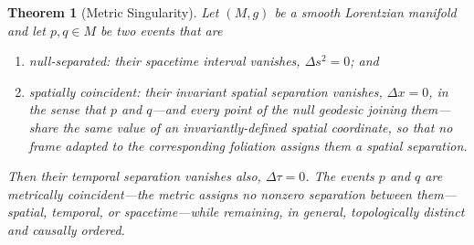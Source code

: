 \documentclass[11pt,a4paper]{article}
\theoremstyle{plain}
\newtheorem{theorem}{Theorem}
\theoremstyle{remark}
\begin{document}
\begin{theorem}[Metric Singularity]\label{thm:metric-singularity}
Let $(M,g)$ be a smooth Lorentzian manifold and let $p,q\in M$ be two events that are
\begin{enumerate}
\item[(a)] \emph{null-separated}: their spacetime interval vanishes, $\Delta s^2=0$; and
\item[(b)] \emph{spatially coincident}: their invariant spatial separation vanishes, $\Delta x=0$, in the sense that $p$ and $q$---and every point of the null geodesic joining them---share the same value of an invariantly-defined spatial coordinate, so that no frame adapted to the corresponding foliation assigns them a spatial separation.
\end{enumerate}
Then their temporal separation vanishes also, $\Delta\tau=0$. The events $p$ and $q$ are \emph{metrically coincident}---the metric assigns no nonzero separation between them---spatial, temporal, or spacetime---while remaining, in general, topologically distinct and causally ordered.
\end{theorem}
\end{document}
